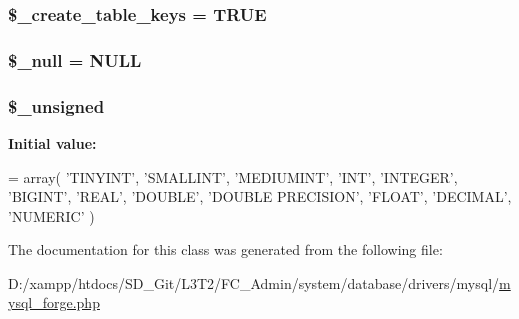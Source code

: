 \subsubsection[{\$\+\_\+create\+\_\+table\+\_\+keys}]{\setlength{\rightskip}{0pt plus 5cm}\$\+\_\+create\+\_\+table\+\_\+keys = T\+R\+U\+E\hspace{0.3cm}{\ttfamily [protected]}}\label{class_c_i___d_b__mysql__forge_a73e07acdd35c948ad353903c2827af6e}
\hypertarget{class_c_i___d_b__mysql__forge_ae58fe6a5104d4a069a49b27533ce808f}{}
\subsubsection[{\$\+\_\+null}]{\setlength{\rightskip}{0pt plus 5cm}\$\+\_\+null = \textquotesingle{}N\+U\+L\+L\textquotesingle{}\hspace{0.3cm}{\ttfamily [protected]}}\label{class_c_i___d_b__mysql__forge_ae58fe6a5104d4a069a49b27533ce808f}
\hypertarget{class_c_i___d_b__mysql__forge_aae977ae6d61fa183f0b25422b6ddc31c}{}
\subsubsection[{\$\+\_\+unsigned}]{\setlength{\rightskip}{0pt plus 5cm}\$\+\_\+unsigned\hspace{0.3cm}{\ttfamily [protected]}}\label{class_c_i___d_b__mysql__forge_aae977ae6d61fa183f0b25422b6ddc31c}
{\bfseries Initial value\+:}
\begin{DoxyCode}
= array(
        \textcolor{stringliteral}{'TINYINT'},
        \textcolor{stringliteral}{'SMALLINT'},
        \textcolor{stringliteral}{'MEDIUMINT'},
        \textcolor{stringliteral}{'INT'},
        \textcolor{stringliteral}{'INTEGER'},
        \textcolor{stringliteral}{'BIGINT'},
        \textcolor{stringliteral}{'REAL'},
        \textcolor{stringliteral}{'DOUBLE'},
        \textcolor{stringliteral}{'DOUBLE PRECISION'},
        \textcolor{stringliteral}{'FLOAT'},
        \textcolor{stringliteral}{'DECIMAL'},
        \textcolor{stringliteral}{'NUMERIC'}
    )
\end{DoxyCode}


The documentation for this class was generated from the following file\+:\begin{DoxyCompactItemize}
\item 
D\+:/xampp/htdocs/\+S\+D\+\_\+\+Git/\+L3\+T2/\+F\+C\+\_\+\+Admin/system/database/drivers/mysql/\hyperlink{mysql__forge_8php}{mysql\+\_\+forge.\+php}\end{DoxyCompactItemize}
